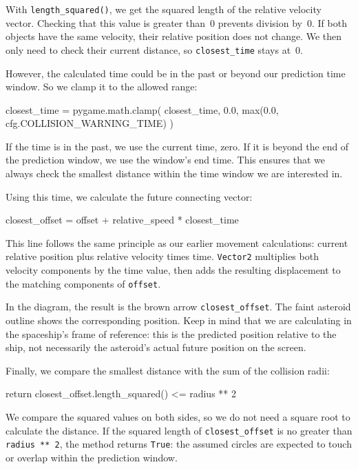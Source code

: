 With \texttt{length\_squared()}, we get the squared length of the relative velocity vector. Checking that this value is greater than~0 prevents division by~0. If both objects have the same velocity, their relative position does not change. We then only need to check their current distance, so \texttt{closest\_time} stays at~0.

However, the calculated time could be in the past or beyond our prediction time window. So we clamp it to the allowed range:

\begin{codebox}
closest_time = pygame.math.clamp(
    closest_time, 0.0, max(0.0, cfg.COLLISION_WARNING_TIME)
)
\end{codebox}

If the time is in the past, we use the current time, zero. If it is beyond the end of the prediction window, we use the window's end time. This ensures that we always check the smallest distance within the time window we are interested in.

Using this time, we calculate the future connecting vector:
\begin{codebox}
	closest_offset = offset + relative_speed * closest_time
\end{codebox}

This line follows the same principle as our earlier movement calculations: current relative position plus relative velocity times time. \texttt{Vector2} multiplies both velocity components by the time value, then adds the resulting displacement to the matching components of \texttt{offset}.

In the diagram, the result is the brown arrow \texttt{closest\_offset}. The faint asteroid outline shows the corresponding position. Keep in mind that we are calculating in the spaceship's frame of reference: this is the predicted position relative to the ship, not necessarily the asteroid's actual future position on the screen.

Finally, we compare the smallest distance with the sum of the collision radii:
\begin{codebox}
	return closest_offset.length_squared() <= radius ** 2
\end{codebox}

We compare the squared values on both sides, so we do not need a square root to calculate the distance. If the squared length of \texttt{closest\_offset} is no greater than \texttt{radius ** 2}, the method returns \texttt{True}: the assumed circles are expected to touch or overlap within the prediction window.

